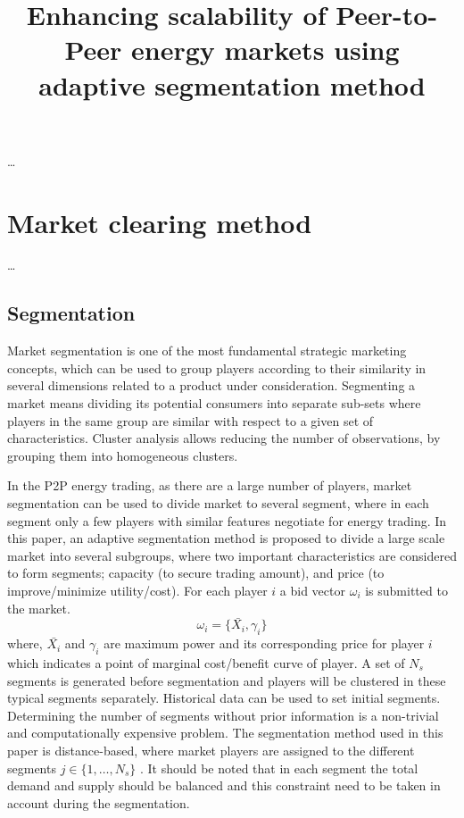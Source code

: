 \documentclass{scrartcl}
\title{Enhancing scalability of Peer-to-Peer energy markets using adaptive segmentation method}
\author{}
\date{}
\begin{document}
\maketitle


\ldots

\section*{Market clearing method}

\ldots	

\subsection*{Segmentation}

Market segmentation is one of the most fundamental
strategic marketing concepts, which can be used to group
players according to their similarity in several dimensions
related to a product under consideration. Segmenting a
market means dividing its potential consumers into separate
sub-sets where players in the same group are similar with
respect to a given set of characteristics. Cluster analysis
allows reducing the number of observations, by grouping
them into homogeneous clusters.

In the P2P energy trading, as there are a large number of
players, market segmentation can be used to divide market
to several segment, where in each segment only a few
players with similar features negotiate for energy trading.
In this paper, an adaptive segmentation method is proposed
to divide a large scale market into several subgroups, where
two important characteristics are considered to form
segments; capacity (to secure trading amount), and price (to
improve/minimize utility/cost). 
For each player $i$ a bid
vector $\omega_i$ is submitted to the market.
\begin{equation}
	\omega_i = \{ \bar{X_i}, \gamma_i \}
\end{equation}
where, $\bar{X_i}$ and $\gamma_i$ are maximum power and its
corresponding price for player $i$ which indicates a point
of marginal cost/benefit curve of player. A set of $N_s$
segments is generated before segmentation and players will
be clustered in these typical segments separately. Historical
data can be used to set initial segments. Determining the
number of segments without prior information is a non-trivial and computationally expensive problem. The
segmentation method used in this paper is distance-based,
where market players are assigned to the different segments
$j \in \{1, \ldots, N_s\}$ . It should be noted that in each segment the total
demand and supply should be balanced and this constraint
need to be taken in account during the segmentation.
\end{document}
